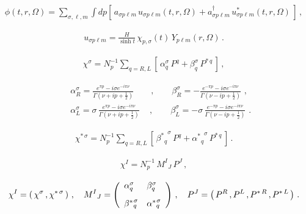 \begin{eqnarray}
\hat\phi(t,r,\Omega) = \sum_{\sigma,\ell,m} \int dp
\left[\,a_{\sigma p\ell m}\,u_{\sigma p\ell m}(t,r,\Omega)
+a_{\sigma p\ell m}^\dagger\,u^*_{\sigma p\ell m}(t,r,\Omega)\,\right]\,,
\label{phi}
\end{eqnarray}


\begin{eqnarray}
u_{\sigma p\ell m} = \frac{H}{\sinh t}\,
\chi_{p,\sigma}(t)\,Y_{p\ell m} (r, \Omega)\,.
\label{bdmf}
\end{eqnarray}

\begin{eqnarray}
\chi^{\sigma} = N_p^{-1} \sum_{q=R,L} \left[\,
 \alpha_q^\sigma\,P^q + \beta_q^\sigma\,P^{*\,q}
\,\right]\,,
\label{sty2}
\end{eqnarray}


\begin{eqnarray}
&&\alpha_R^\sigma = \frac{e^{\pi p} -i\sigma e^{-i\pi \nu}}{\Gamma (\nu+ip +\frac{1}{2})}\qquad,\qquad
\beta_R^\sigma =-\frac{e^{-\pi p} -i\sigma e^{-i\pi \nu}}{\Gamma (\nu-ip +\frac{1}{2})} \,\,,\\
&&\alpha_L^\sigma =\sigma\,\frac{e^{\pi p} -i\sigma e^{-i\pi \nu}}{\Gamma (\nu+ip +\frac{1}{2})}
\quad\,,\qquad
\beta_L^\sigma =-\sigma\,\frac{e^{-\pi p} -i\sigma e^{-i\pi \nu}}{\Gamma (\nu-ip +\frac{1}{2})}   \,\,.
\end{eqnarray}


\begin{eqnarray}
\chi^{*\,\sigma}=N_p^{-1}\sum_{q=R,L} \left[\,
{\beta^{*}{}_q}^{\!\!\!\sigma}\,P^q + {\alpha^{*}{}_q}^{\!\!\!\sigma}\,P^{*\,q}
\,\right]\,.
\end{eqnarray}

\begin{eqnarray}
\chi^I=N_p^{-1}\,M^I{}_J\,P^J\,,
\end{eqnarray}

\begin{eqnarray}
\chi^I=\left(\,\chi^\sigma\,,\chi^{*\,\sigma}\,\right)\,,\quad
M^I{}_J=\left(
\begin{array}{ll}
\alpha^\sigma_q & \beta^\sigma_q \vspace{3mm}\\
{\beta^{*}{}_q}^{\!\!\!\sigma} & {\alpha^{*}{}_q}^{\!\!\!\sigma} \\
\end{array}\right)\,,\quad
P^J=\left(\,P^R\,,P^L\,,P^{*\,R}\,, P^{*\,L}\,\right)\,.
\end{eqnarray}


